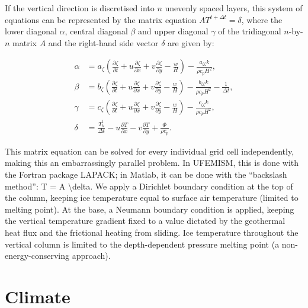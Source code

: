\documentclass{article}
\begin{document}
If the vertical direction is discretised into $n$ unevenly spaced layers, this system of equations can be represented by the matrix equation $A T^{t+\Delta t} = \delta$, where the lower diagonal $\alpha$, central diagonal $\beta$ and upper diagonal $\gamma$ of the tridiagonal $n$-by-$n$ matrix $A$ and the right-hand side vector $\delta$ are given by:

\begin{align}
\alpha &= a_{\zeta} \left( \frac{\partial \zeta}{\partial t} + u \frac{\partial \zeta}{\partial x} + v \frac{\partial \zeta}{\partial y} - \frac{w}{H} \right) - \frac{a_{\zeta \zeta} k}{\rho c_p H^2}, \\
\beta &= b_{\zeta} \left( \frac{\partial \zeta}{\partial t} + u \frac{\partial \zeta}{\partial x} + v \frac{\partial \zeta}{\partial y} - \frac{w}{H} \right) - \frac{b_{\zeta \zeta} k}{\rho c_p H^2} - \frac{1}{\Delta t}, \\
\gamma &= c_{\zeta} \left( \frac{\partial \zeta}{\partial t} + u \frac{\partial \zeta}{\partial x} + v \frac{\partial \zeta}{\partial y} - \frac{w}{H} \right) - \frac{c_{\zeta \zeta} k}{\rho c_p H^2}, \\
\delta &= \frac{T_k^t}{\Delta t} - u \frac{\partial T}{\partial x} - v \frac{\partial T}{\partial y} + \frac{\Phi}{\rho c_p}.
\end{align}

This matrix equation can be solved for every individual grid cell independently, making this an embarrassingly parallel problem. In UFEMISM, this is done with the Fortran package LAPACK; in Matlab, it can be done with the “backslash method”: T = A \textbackslash delta. We apply a Dirichlet boundary condition at the top of the column, keeping ice temperature equal to surface air temperature (limited to melting point). At the base, a Neumann boundary condition is applied, keeping the vertical temperature gradient fixed to a value dictated by the geothermal heat flux and the frictional heating from sliding. Ice temperature throughout the vertical column is limited to the depth-dependent pressure melting point (a non-energy-conserving approach).

\newpage
\section{Climate}
\end{document}
